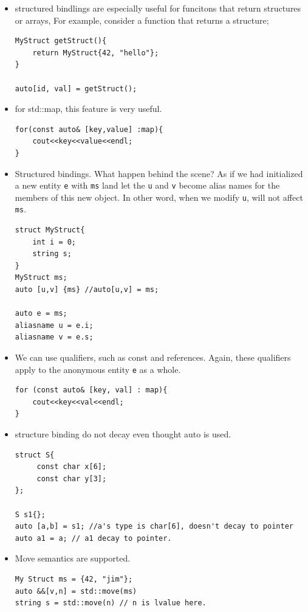 \documentclass[a4paper,11pt,twoside]{book}
\begin{document}
\begin{itemize}
	\item structured bindlings are especially useful for funcitons that return structures or arrays, For example, consider a function that returns a structure;
	
\begin{lstlisting}
MyStruct getStruct(){
	return MyStruct{42, "hello"};
}	

auto[id, val] = getStruct();
\end{lstlisting}

	\item for std::map, this feature is very useful.
\begin{lstlisting}
for(const auto& [key,value] :map){
	cout<<key<<value<<endl;
}
\end{lstlisting}
	
	
	\item Structured bindings. What happen behind the scene? As if we had initialized a new entity \texttt{e} with \texttt{ms} land let the \texttt{u} and \texttt{v} become alias names for the members of this new object. In other word, when we modify \texttt{u}, will not affect \texttt{ms}.
\begin{lstlisting}
struct MyStruct{
	int i = 0;
	string s;
}
MyStruct ms;
auto [u,v] {ms} //auto[u,v] = ms;	

auto e = ms;
aliasname u = e.i;
aliasname v = e.s;
\end{lstlisting}
	
\item We can use qualifiers, such as const and references. Again, these qualifiers apply to the anonymous entity \texttt{e} as a whole.

\begin{lstlisting}
for (const auto& [key, val] : map){
	cout<<key<<val<<endl;
}
\end{lstlisting}	


\item structure binding do not decay even thought auto is used. 

\begin{lstlisting}
struct S{
	 const char x[6];
	 const char y[3];
};

S s1{};
auto [a,b] = s1; //a's type is char[6], doesn't decay to pointer
auto a1 = a; // a1 decay to pointer. 
\end{lstlisting}	


\item Move semantics are supported.

\begin{lstlisting}
My Struct ms = {42, "jim"};
auto &&[v,n] = std::move(ms)
string s = std::move(n) // n is lvalue here.


\end{lstlisting}
\end{itemize}
\end{document}
